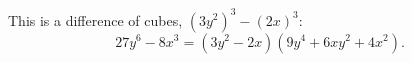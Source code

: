 This is a difference of cubes, $\left(3y^2\right)^3-(2x)^3$:
\[27y^6-8x^3=\boxed{\left(3y^2-2x\right)\left(9y^4+6xy^2+4x^2\right)}.\]
